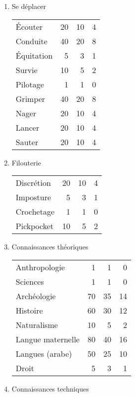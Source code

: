\documentclass[11pt]{article}
\begin{document}
\begin{twocols}
\begin{enumerate}
\item Se déplacer
\label{sec:orgb78c8c1}

\begin{center}
\begin{tabular}{lrrr}
Écouter & 20 & 10 & 4\\
Conduite & 40 & 20 & 8\\
Équitation & 5 & 3 & 1\\
Survie & 10 & 5 & 2\\
Pilotage & 1 & 1 & 0\\
Grimper & 40 & 20 & 8\\
Nager & 20 & 10 & 4\\
Lancer & 20 & 10 & 4\\
Sauter & 20 & 10 & 4\\
\end{tabular}
\end{center}

\item Filouterie
\label{sec:orgc24d88e}

\begin{center}
\begin{tabular}{lrrr}
Discrétion & 20 & 10 & 4\\
Imposture & 5 & 3 & 1\\
Crochetage & 1 & 1 & 0\\
Pickpocket & 10 & 5 & 2\\
\end{tabular}
\end{center}

\item Connaissances théoriques
\label{sec:org5413b60}

\begin{center}
\begin{tabular}{lrrr}
Anthropologie & 1 & 1 & 0\\
Sciences & 1 & 1 & 0\\
Archéologie & 70 & 35 & 14\\
Histoire & 60 & 30 & 12\\
Naturalisme & 10 & 5 & 2\\
Langue maternelle & 80 & 40 & 16\\
Langues (arabe) & 50 & 25 & 10\\
Droit & 5 & 3 & 1\\
\end{tabular}
\end{center}

\item Connaissances techniques
\label{sec:org05a06f4}


\end{enumerate}
\end{twocols}
\end{document}
